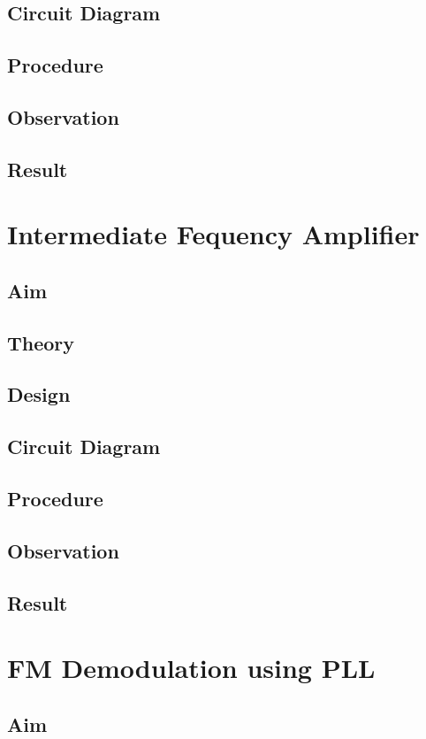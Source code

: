 \documentclass{book}
\begin{document}
\section*{Circuit Diagram}
\section*{Procedure}
\section*{Observation}
\section*{Result}

\chapter[Intermediate Fequency Amplifier]{Intermediate Fequency Amplifier}
\section*{Aim}
\section*{Theory}
\section*{Design}
\section*{Circuit Diagram}
\section*{Procedure}
\section*{Observation}
\section*{Result}

\chapter[FM Demodulation using PLL]{FM Demodulation using PLL}
\section*{Aim}
\end{document}
